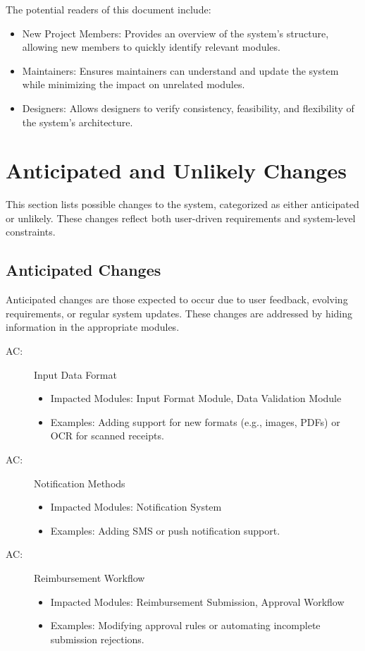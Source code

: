 \documentclass[12pt, titlepage]{article}
\newcounter{acnum}
\newcommand{\actheacnum}{AC\theacnum}
\begin{document}
The potential readers of this document include:
\begin{itemize}
    \item New Project Members: Provides an overview of the system's structure, allowing new members to quickly identify relevant modules.
    \item Maintainers: Ensures maintainers can understand and update the system while minimizing the impact on unrelated modules.
    \item Designers: Allows designers to verify consistency, feasibility, and flexibility of the system's architecture.
\end{itemize}

\section{Anticipated and Unlikely Changes} \label{SecChange}

This section lists possible changes to the system, categorized as either anticipated or unlikely. These changes reflect both user-driven requirements and system-level constraints.

\subsection{Anticipated Changes} \label{SecAchange}

Anticipated changes are those expected to occur due to user feedback, evolving requirements, or regular system updates. These changes are addressed by hiding information in the appropriate modules.

\begin{description}
\item[ \actheacnum \label{acInput}:] Input Data Format 
\begin{itemize}
    \item Impacted Modules: Input Format Module, Data Validation Module
    \item Examples: Adding support for new formats (e.g., images, PDFs) or OCR for scanned receipts.
\end{itemize}

\item[ \actheacnum \label{acNotifications}:] Notification Methods
\begin{itemize}
    \item Impacted Modules: Notification System
    \item Examples: Adding SMS or push notification support.
\end{itemize}

\item[ \actheacnum \label{acWorkflow}:] Reimbursement Workflow
\begin{itemize}
    \item Impacted Modules: Reimbursement Submission, Approval Workflow
    \item Examples: Modifying approval rules or automating incomplete submission rejections.
\end{itemize}
\end{description}
\end{document}
